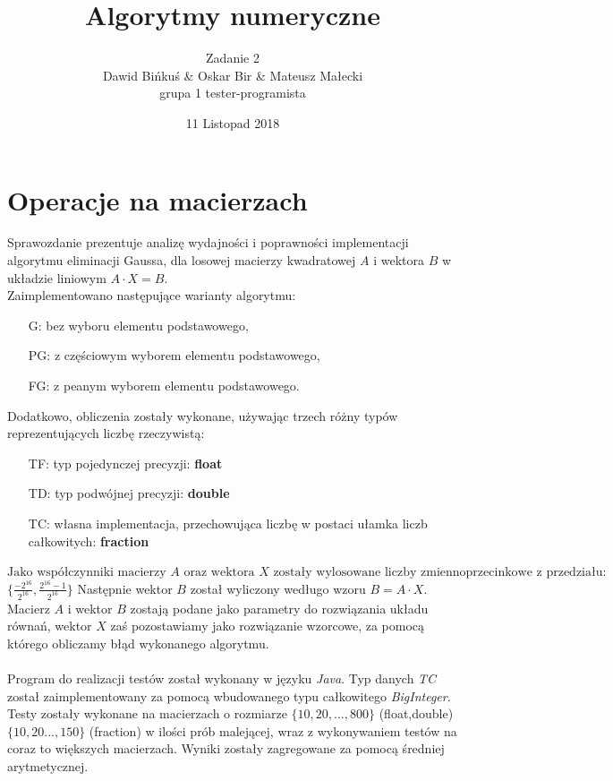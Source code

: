 \documentclass[10pt]{article}
\title{Algorytmy numeryczne}
\author{Zadanie 2 \\ Dawid Bińkuś \& Oskar Bir \& Mateusz Małecki\\grupa 1 tester-programista}
\date{11 Listopad 2018}
\begin{document}
\maketitle 

\section{Operacje na macierzach}
Sprawozdanie prezentuje analizę wydajności i poprawności implementacji algorytmu eliminacji Gaussa, dla losowej macierzy kwadratowej $A$ i wektora $B$ w układzie liniowym
$A\cdot X = B.$\\
Zaimplementowano następujące warianty algorytmu:
\begin{itemize}
	\item[G:]bez wyboru elementu podstawowego,
	\item [PG:]z częściowym wyborem elementu podstawowego,
	\item [FG:]z peanym wyborem elementu podstawowego.
\end{itemize}
Dodatkowo, obliczenia zostały wykonane, używając trzech różny typów reprezentujących liczbę rzeczywistą:
\begin{itemize}
	\item[TF:]typ pojedynczej precyzji: \textbf{float}
	\item[TD:]typ podwójnej precyzji: \textbf{double}
	\item[TC:]własna implementacja, przechowująca liczbę w postaci ułamka liczb całkowitych: \textbf{fraction}
\end{itemize}
$\text{Jako współczynniki macierzy } A \text{ oraz wektora } X \text{ zostały wylosowane liczby zmiennoprzecinkowe z przedziału: }$\\
$\{\frac{-2^{16}}{2^{16}},\frac{2^{16}-1}{2^{16}}\}$ Następnie wektor $B$ został wyliczony wedługo wzoru $B = A\cdot X$.
Macierz $A$ i wektor $B$ zostają podane jako parametry do rozwiązania układu równań, wektor $X$ zaś pozostawiamy jako rozwiązanie wzorcowe, za pomocą którego obliczamy błąd wykonanego algorytmu.\\\\
Program do realizacji testów został wykonany w języku \textit{Java}. Typ danych \textit{TC} został zaimplementowany za pomocą wbudowanego typu całkowitego \emph{BigInteger}. Testy zostały wykonane na macierzach o rozmiarze $\{10,20,...,800\}$ (float,double) $\{10,20...,150\}$ (fraction) 
w ilości prób malejącej, wraz z wykonywaniem testów na coraz to większych macierzach. Wyniki zostały zagregowane za pomocą średniej arytmetycznej.
\end{document}
